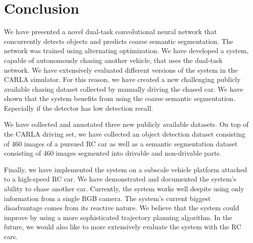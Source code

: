 \documentclass{ctuthesis/ctuthesis}
\begin{document}
\chapter{Conclusion} \label{s:conclusion}
We have presented a novel dual-task convolutional neural network that concurrently detects objects and predicts coarse semantic segmentation. The network was trained using alternating optimization. We have developed a system, capable of autonomously chasing another vehicle, that uses the dual-task network. We have extensively evaluated different versions of the system in the CARLA simulator. For this reason, we have created a new challenging publicly available chasing dataset collected by manually driving the chased car. We have shown that the system benefits from using the coarse semantic segmentation. Especially if the detector has low detection recall.\par
We have collected and annotated three new publicly available datasets. On top of the CARLA driving set, we have collected an object detection dataset consisting of 460 images of a pursued RC car as well as a semantic segmentation dataset consisting of 460 images segmented into drivable and non-drivable parts. \par
Finally, we have implemented the system on a subscale vehicle platform attached to a high-speed RC car. We have demonstrated and documented \cite{my_yt_video} the system's ability to chase another car. Currently, the system works well despite using only information from a single RGB camera. The system's current biggest disadvantage comes from its reactive nature. We believe that the system could improve by using a more sophisticated trajectory planning algorithm. In the future, we would also like to more extensively evaluate the system with the RC cars.



\end{document}
